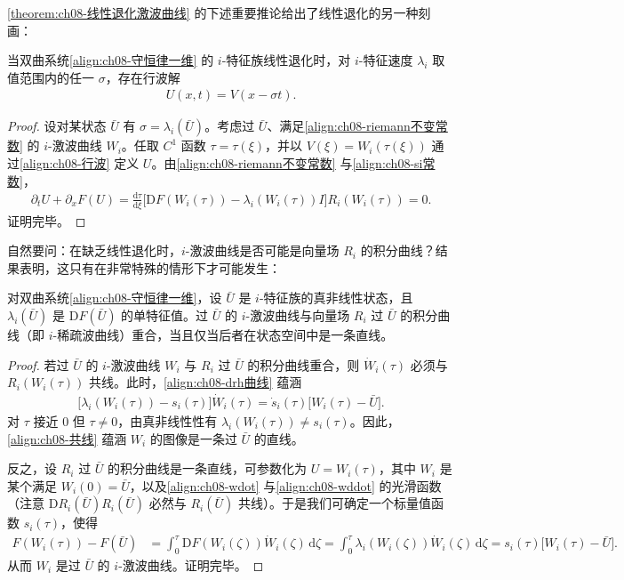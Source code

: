 \documentclass[../../main.tex]{subfiles}
\begin{document}
\cref{theorem:ch08-线性退化激波曲线} 的下述重要推论给出了线性退化的另一种刻画：

\begin{corollary}[线性退化族的行波解]\label{corollary:ch08-行波解}
当双曲系统\eqref{align:ch08-守恒律一维} 的 $i$-特征族线性退化时，对 $i$-特征速度 $\lambda_i$ 取值范围内的任一 $\sigma$，存在行波解
\begin{align}
U(x,t)=V(x-\sigma t).
\label{align:ch08-行波}
\end{align}
\end{corollary}

\begin{proof}
设对某状态 $\bar U$ 有 $\sigma=\lambda_i(\bar U)$。考虑过 $\bar U$、满足\eqref{align:ch08-riemann不变常数} 的 $i$-激波曲线 $W_i$。任取 $C^1$ 函数 $\tau=\tau(\xi)$，并以 $V(\xi)=W_i(\tau(\xi))$ 通过\eqref{align:ch08-行波} 定义 $U$。由\eqref{align:ch08-riemann不变常数} 与\eqref{align:ch08-si常数}，
\begin{align}
\partial_t U+\partial_x F(U)=\frac{\mathrm{d}\tau}{\mathrm{d}\xi}
\big[\mathrm{D}F(W_i(\tau))-\lambda_i(W_i(\tau))I\big]R_i(W_i(\tau))=0.
\label{align:ch08-行波代入}
\end{align}
证明完毕。
\end{proof}

自然要问：在缺乏线性退化时，$i$-激波曲线是否可能是向量场 $R_i$ 的积分曲线？结果表明，这只有在非常特殊的情形下才可能发生：

\begin{theorem}[激波曲线与积分曲线重合的条件]\label{theorem:ch08-重合条件}
对双曲系统\eqref{align:ch08-守恒律一维}，设 $\bar U$ 是 $i$-特征族的真非线性状态，且 $\lambda_i(\bar U)$ 是 $\mathrm{D}F(\bar U)$ 的单特征值。过 $\bar U$ 的 $i$-激波曲线与向量场 $R_i$ 过 $\bar U$ 的积分曲线（即 $i$-稀疏波曲线）重合，当且仅当后者在状态空间中是一条直线。
\end{theorem}

\begin{proof}
若过 $\bar U$ 的 $i$-激波曲线 $W_i$ 与 $R_i$ 过 $\bar U$ 的积分曲线重合，则 $\dot W_i(\tau)$ 必须与 $R_i(W_i(\tau))$ 共线。此时，\eqref{align:ch08-drh曲线} 蕴涵
\begin{align}
\big[\lambda_i(W_i(\tau))-s_i(\tau)\big]\dot W_i(\tau)
=\dot s_i(\tau)\big[W_i(\tau)-\bar U\big].
\label{align:ch08-共线}
\end{align}
对 $\tau$ 接近 $0$ 但 $\tau\neq0$，由真非线性性有 $\lambda_i(W_i(\tau))\neq s_i(\tau)$。因此，\eqref{align:ch08-共线} 蕴涵 $W_i$ 的图像是一条过 $\bar U$ 的直线。

反之，设 $R_i$ 过 $\bar U$ 的积分曲线是一条直线，可参数化为 $U=W_i(\tau)$，其中 $W_i$ 是某个满足 $W_i(0)=\bar U$，以及\eqref{align:ch08-wdot} 与\eqref{align:ch08-wddot} 的光滑函数（注意 $\mathrm{D}R_i(\bar U)R_i(\bar U)$ 必然与 $R_i(\bar U)$ 共线）。于是我们可确定一个标量值函数 $s_i(\tau)$，使得
\begin{align}
F(W_i(\tau))-F(\bar U)
&=\int_0^\tau \mathrm{D}F(W_i(\zeta))\dot W_i(\zeta)\,\mathrm{d}\zeta
=\int_0^\tau \lambda_i(W_i(\zeta))\dot W_i(\zeta)\,\mathrm{d}\zeta
=s_i(\tau)\big[W_i(\tau)-\bar U\big].
\label{align:ch08-直线积分}
\end{align}
从而 $W_i$ 是过 $\bar U$ 的 $i$-激波曲线。证明完毕。
\end{proof}
\end{document}
